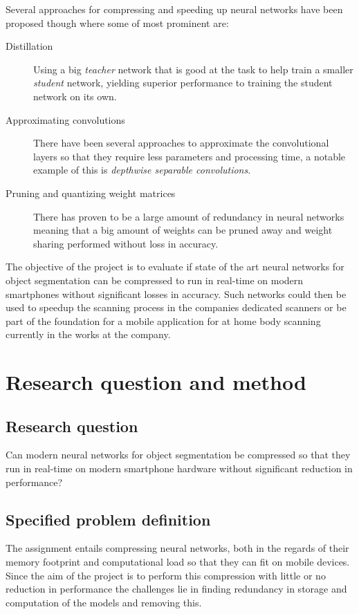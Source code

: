 \documentclass[11pt]{article}
\newcommand{\bibentry}[1]{\cite{#1}}
\begin{document}
Several approaches for compressing and speeding up neural networks have been proposed though where some of most prominent are: 
\begin{description}
\item[{Distillation}] Using a big \emph{teacher} network that is good at the task to help train a smaller \emph{student} network, yielding superior performance to training the student network on its own\bibentry{bucilua2006model}.
\item[{Approximating convolutions}] There have been several approaches to approximate the convolutional layers so that they require less parameters and processing time, a notable example of this is \emph{depthwise separable convolutions}\bibentry{howard2017mobilenets}.
\item[{Pruning and quantizing weight matrices}] There has proven to be a large amount of redundancy in neural networks meaning that a big amount of weights can be pruned away and weight sharing performed without loss in accuracy\bibentry{denil2013predicting}.
\end{description}

The objective of the project is to evaluate if state of the art neural networks for object segmentation can be compressed to run in real-time on modern smartphones without significant losses in accuracy. Such networks could then be used to speedup the scanning process in the companies dedicated scanners or be part of the foundation for a mobile application for at home body scanning currently in the works at the company.


\section{Research question and method}
\label{sec:org2517464}
\subsection{Research question}
\label{sec:orgd145f35}
Can modern neural networks for object segmentation be compressed so that they run in real-time on modern smartphone hardware without significant reduction in performance?

\subsection{Specified problem definition}
\label{sec:org0db647c}
The assignment entails compressing neural networks, both in the regards of their memory footprint and computational load so that they can fit on mobile devices. Since the aim of the project is to perform this compression with little or no reduction in performance the challenges lie in finding redundancy in storage and computation of the models and removing this.
\end{document}
